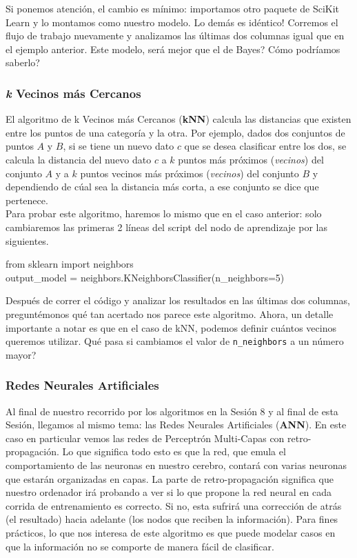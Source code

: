 \documentclass[10pt,letterpaper]{article}
\newcommand{\inlinecode}[1]{
\colorbox{light-gray}{\texttt{#1}}
}
\newenvironment{Code}
{
\begin{lrbox}{\selvestebox}%
\begin{minipage}{\dimexpr\columnwidth-2\fboxsep\relax}
\fontfamily{\ttdefault}\selectfont
}
{\end{minipage}\end{lrbox}%
\begin{center}
\colorbox{light-gray}{\usebox{\selvestebox}}
\end{center}
}
\begin{document}
Si ponemos atenci\'on, el cambio es m\'inimo: importamos otro paquete de SciKit Learn y lo montamos como nuestro modelo. Lo dem\'as es id\'entico! Corremos el flujo de trabajo nuevamente y analizamos las \'ultimas dos columnas igual que en el ejemplo anterior. Este modelo, ser\'a mejor que el de Bayes? C\'omo podr\'iamos saberlo?

\subsubsection{\emph{k} Vecinos m\'as Cercanos}
El algoritmo de k Vecinos m\'as Cercanos (\textbf{kNN}) calcula las distancias que existen entre los puntos de una categor\'ia y la otra. Por ejemplo, dados dos conjuntos de puntos $A$ y $B$, si se tiene un nuevo dato $c$ que se desea clasificar entre los dos, se calcula la distancia del nuevo dato $c$ a $k$ puntos m\'as pr\'oximos (\textit{vecinos}) del conjunto $A$ y a $k$ puntos vecinos m\'as pr\'oximos (\textit{vecinos}) del conjunto $B$ y dependiendo de c\'ual sea la distancia m\'as corta, a ese conjunto se dice que pertenece.\\

\noindent Para probar este algoritmo, haremos lo mismo que en el caso anterior: solo cambiaremos las primeras 2 l\'ineas del script del nodo de aprendizaje por las siguientes.

\begin{Code}
from sklearn import neighbors\\

output\_model = neighbors.KNeighborsClassifier(n\_neighbors=5)
\end{Code}

Despu\'es de correr el c\'odigo y analizar los resultados en las \'ultimas dos columnas, pregunt\'emonos qu\'e tan acertado nos parece este algoritmo. Ahora, un detalle importante a notar es que en el caso de kNN, podemos definir cu\'antos vecinos queremos utilizar. Qu\'e pasa si cambiamos el valor de \inlinecode{n\_neighbors} a un n\'umero mayor?

\subsubsection{Redes Neurales Artificiales}
Al final de nuestro recorrido por los algoritmos en la Sesi\'on 8 y al final de esta Sesi\'on, llegamos al mismo tema: las Redes Neurales Artificiales (\textbf{ANN}). En este caso en particular vemos las redes de Perceptr\'on Multi-Capas con retro-propagaci\'on. Lo que significa todo esto es que la red, que emula el comportamiento de las neuronas en nuestro cerebro, contar\'a con varias neuronas que estar\'an organizadas en capas. La parte de retro-propagaci\'on significa que nuestro ordenador ir\'a probando a ver si lo que propone la red neural en cada corrida de entrenamiento es correcto. Si no, esta sufrir\'a una correcci\'on de atr\'as (el resultado) hacia adelante (los nodos que reciben la informaci\'on). Para fines pr\'acticos, lo que nos interesa de este algoritmo es que puede modelar casos en que la informaci\'on no se comporte de manera f\'acil de clasificar.\\
\end{document}
